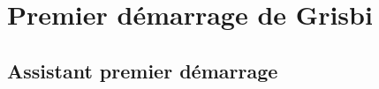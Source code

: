 

\chapter{Premier démarrage de Grisbi\label{start}}


\section{Assistant premier démarrage\label{start-first}}


